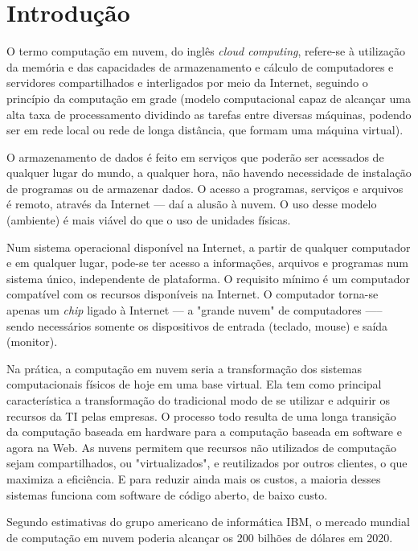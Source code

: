 \section{Introdução}

O termo computação em nuvem, do inglês \emph{cloud computing}, refere-se à
utilização da memória e das capacidades de armazenamento e cálculo de
computadores e servidores compartilhados e interligados por meio da Internet,
seguindo o princípio da computação em grade (modelo computacional capaz de
alcançar uma alta taxa de processamento dividindo as tarefas entre diversas
máquinas, podendo ser em rede local ou rede de longa distância, que formam uma
máquina virtual).

O armazenamento de dados é feito em serviços que poderão ser acessados de qualquer
lugar do mundo, a qualquer hora, não havendo necessidade de instalação de
programas ou de armazenar dados. O acesso a programas, serviços e arquivos é
remoto, através da Internet --- daí a alusão à nuvem. O uso desse modelo
(ambiente) é mais viável do que o uso de unidades físicas.

Num sistema operacional disponível na Internet, a partir de qualquer computador e em
qualquer lugar, pode-se ter acesso a informações, arquivos e programas num sistema
único, independente de plataforma. O requisito mínimo é um computador compatível
com os recursos disponíveis na Internet. O computador torna-se apenas um \emph{chip}
ligado à Internet — a "grande nuvem" de computadores —-- sendo necessários
somente os dispositivos de entrada (teclado, mouse) e saída (monitor).

Na prática, a computação em nuvem seria a transformação dos sistemas
computacionais físicos de hoje em uma base virtual. Ela tem como principal
característica a transformação do tradicional modo de se utilizar e adquirir os
recursos da TI pelas empresas. O processo todo resulta de uma longa transição da
computação baseada em hardware para a computação baseada em software e agora na
Web. As nuvens permitem que recursos não utilizados de computação sejam
compartilhados, ou "virtualizados", e reutilizados por outros clientes, o que
maximiza a eficiência. E para reduzir ainda mais os custos, a maioria desses
sistemas funciona com software de código aberto, de baixo custo.

Segundo estimativas do grupo americano de informática IBM, o mercado mundial de
computação em nuvem poderia alcançar os 200 bilhões de dólares em 2020.
